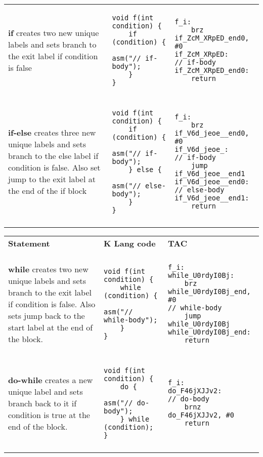 \begin{tabular}{l l l}
\parbox{5cm}{\textbf{if} creates two new unique labels and sets branch to the exit label if condition is false} &
\begin{lstlisting}
void f(int condition) {
	if (condition) {
		asm("// if-body");
	}
}
\end{lstlisting} &
\begin{lstlisting}
f_i:
	brz if_ZcM_XRpED_end0, #0
if_ZcM_XRpED:
// if-body
if_ZcM_XRpED_end0:
	return
\end{lstlisting} \\ \\


\parbox{5cm}{\textbf{if-else} creates three new unique labels and sets branch to the else label if condition is false. Also set jump to the exit label at the end of the if block} &
\begin{lstlisting}
void f(int condition) {
	if (condition) {
		asm("// if-body");
	} else {
		asm("// else-body");
	}
}
\end{lstlisting} &
\begin{lstlisting}
f_i:
	brz if_V6d_jeoe__end0, #0
if_V6d_jeoe_:
// if-body
	jump if_V6d_jeoe__end1
if_V6d_jeoe__end0:
// else-body
if_V6d_jeoe__end1:
	return
\end{lstlisting} \\ \\

\end{tabular}
\clearpage
\begin{tabular}{l l l}
\textbf{Statement} & \textbf{K Lang code} & \textbf{TAC} \\ \\

\parbox{5cm}{\textbf{while} creates two new unique labels and sets branch to the exit label if condition is false. Also sets jump back to the start label at the end of the block.} &
\begin{lstlisting}
void f(int condition) {
	while (condition) {
		asm("// while-body");
	}
}
\end{lstlisting} &
\begin{lstlisting}
f_i:
while_U0rdyI0Bj:
	brz while_U0rdyI0Bj_end, #0
// while-body
	jump while_U0rdyI0Bj
while_U0rdyI0Bj_end:
	return
\end{lstlisting} \\ \\



\parbox{5cm}{\textbf{do-while} creates a new unique label and sets branch back to it if condition is true at the end of the block.} &
\begin{lstlisting}
void f(int condition) {
	do {
		asm("// do-body");
	} while (condition);
}
\end{lstlisting} &
\begin{lstlisting}
f_i:
do_F46jXJJv2:
// do-body
	brnz do_F46jXJJv2, #0
	return
\end{lstlisting} \\ \\


\end{tabular}





